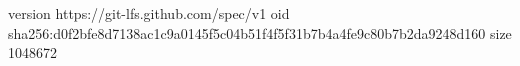 version https://git-lfs.github.com/spec/v1
oid sha256:d0f2bfe8d7138ac1c9a0145f5c04b51f4f5f31b7b4a4fe9c80b7b2da9248d160
size 1048672
